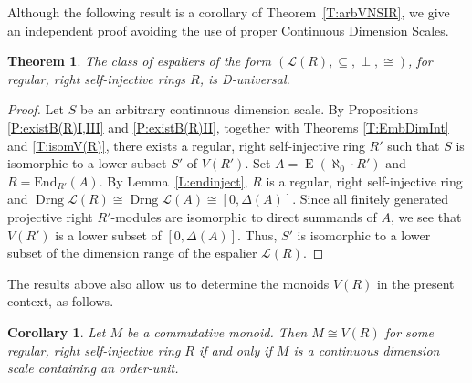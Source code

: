 \documentclass[psamsfonts,reqno]{memo-l}
\theoremstyle{plain}
\newtheorem{theorem}[lemma]{Theorem}
\newtheorem{corollary}[lemma]{Corollary}
\theoremstyle{definition}
\theoremstyle{remark}
\numberwithin{equation}{section}
\DeclareMathOperator{\rE}{E}
\DeclareMathOperator{\Drng}{Drng}
\newcommand{\Lat}{\mathcal{L}}
\newcommand{\End}{\mathrm{End}}
\begin{document}
Although the following result is a corollary of Theorem~\ref{T:arbVNSIR}, we
give an independent proof avoiding the use of proper Continuous Dimension
Scales.

\begin{theorem}\label{T:L(R)Duniv}
The class of espaliers of the form
$(\Lat(R),{\subseteq},{\perp},{\cong})$, for regular, right
self-injective rings $R$,
%
is D-universal.
\end{theorem}

\begin{proof}
Let $S$ be an arbitrary continuous dimension scale. By
Propositions \ref{P:existB(R)I,III} and
\ref{P:existB(R)II}, together with Theorems \ref{T:EmbDimInt} and
\ref{T:isomV(R)}, there exists a regular, right self-injective
ring $R'$
%
such that $S$ is isomorphic to a lower subset
$S'$ of $V(R')$. Set $A=\rE(\aleph_0\cdot R')$\index{ErzzE@$\rE(M)$} and
$R=\End_{R'}(A)$. By Lemma~\ref{L:endinject}, $R$ is a regular, right
self-injective ring and\index{Dzzrng@$\Drng L$} $\Drng\Lat(R)\cong
\Drng \Lat(A)\cong [0,\Delta(A)]$. Since all finitely generated
projective right $R'$-modules are isomorphic to direct summands of
$A$, we see that $V(R')$ is a lower subset of
$[0,\Delta(A)]$. Thus,
$S'$ is isomorphic to a lower subset of the dimension range of the espalier $\Lat(R)$.
\end{proof}

The results above also allow us to determine the monoids
$V(R)$ in the present context, as follows.

\begin{corollary}\label{C:determineV(R)}
Let $M$ be a commutative monoid.
Then $M\cong V(R)$ for some regular,
right self-injective ring $R$
%
if and only if $M$ is a continuous dimension scale containing
an order-unit.
\end{corollary}
\end{document}
